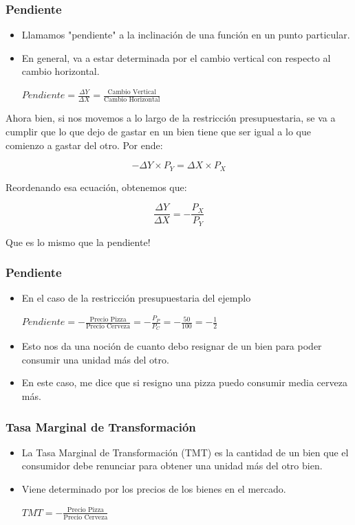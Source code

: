\documentclass{beamer}
\begin{document}
\begin{frame}
\frametitle{Pendiente}
\begin{itemize}
    \item Llamamos "pendiente" a la inclinación de una función en un punto particular.
    \item En general, va a estar determinada por el cambio vertical con respecto al cambio horizontal. \\ \vspace{2mm}
    \begin{center}
        $Pendiente =\frac{\Delta Y}{\Delta X} = \frac{\text{Cambio Vertical}}
    {\text{Cambio Horizontal}}$
    \end{center}
\end{itemize} 
Ahora bien, si nos movemos a lo largo de la restricción presupuestaria, se va a cumplir que lo que dejo de gastar en un bien tiene que ser igual a lo que comienzo a gastar del otro. Por ende:
\begin{center}
    \[-\Delta Y \times P_Y = \Delta X \times P_X \]
\end{center}
Reordenando esa ecuación, obtenemos que:
\begin{center}
    \[\frac{\Delta Y}{\Delta X} = -\frac{P_X}{P_Y} \]
\end{center}
Que es lo mismo que la pendiente!

\end{frame}

\begin{frame}
\frametitle{Pendiente}
    \begin{itemize}
        \item En el caso de la restricción presupuestaria del ejemplo \\
        \begin{center}
            $Pendiente = - \frac{\text{Precio Pizza}}{\text{Precio Cerveza}}= -\frac{P_P}{P_C} = -\frac{50}{100} = -\frac{1}{2}$
        \end{center}
        \item Esto nos da una noción de cuanto debo resignar de un bien para poder consumir una unidad más del otro.
        \item En este caso, me dice que si resigno una pizza puedo consumir media cerveza más.
    \end{itemize}
\end{frame}

\begin{frame}
\frametitle{Tasa Marginal de Transformación}
\begin{itemize}
    \item La Tasa Marginal de Transformación (TMT) es la cantidad de un bien que el consumidor debe renunciar para obtener una unidad más del otro bien.
    \item Viene determinado por los precios de los bienes en el mercado.\\ \vspace{6mm} 
    \begin{center}
      $TMT = - \frac{\text{Precio Pizza}}{\text{Precio Cerveza}}$
      \end{center}
\end{itemize} 
\end{frame}
\end{document}
